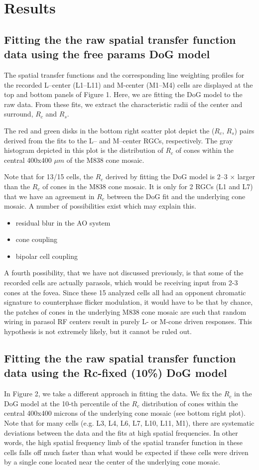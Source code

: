 \documentclass[11pt, oneside]{article}   	%
\begin{document}
\section{Results}
%
\subsection{Fitting the the raw spatial transfer function data using the free params DoG model}
The spatial transfer functions and the corresponding line weighting profiles for the recorded L--center (L1--L11) and M-center (M1--M4) cells are displayed at the top and bottom panels of Figure 1. Here, we are fitting the DoG model to the raw data. From these fits, we extract the characteristic radii of the center and surround,  $R_c$  and $R_s$. 

The red and green disks in the bottom right scatter plot depict the ($R_c$, $R_s$) pairs derived from the fits to the L-- and M--center RGCs, respectively. The gray histogram depicted in this plot is the distribution of $R_c$ of cones within the central 400x400 $\mu m$  of the M838 cone mosaic.

Note that for 13/15 cells, the $R_c$ derived by fitting the DoG model is 2--3 $\times$  larger than the $R_c$ of cones in the M838 cone mosaic. It is only for 2 RGCs (L1 and L7) that we have an agreement in $R_c$ between the DoG fit and the underlying cone mosaic. A number of possibilities exist which may explain this.
\begin{itemize}
\item residual blur in the AO system
\item cone coupling
\item bipolar cell coupling
\end{itemize}

A fourth possibility, that we have not discussed previously, is that some of the recorded cells are actually parasols, which would be receiving input from 2-3 cones at the fovea. Since these 15 analyzed cells all had an opponent chromatic signature to counterphase flicker modulation, it would have to be that by chance, the patches of cones in the underlying M838 cone mosaic are such that random wiring in  parasol RF centers result in purely L- or M-cone driven responses. This hypothesis is not extremely likely, but it cannot be ruled out.

\subsection{Fitting the the raw spatial transfer function data using the Rc-fixed (10\%) DoG model}
In Figure 2, we take a different approach in fitting the data. We fix the $R_c$  in the DoG model at the 10-th percentile of the $R_c$ distribution of cones within the central 400x400 microns of the underlying cone mosaic (see bottom right plot). Note that for many cells (e.g. L3, L4, L6, L7, L10, L11, M1), there are systematic deviations between the data and the fits at high spatial frequencies. In other words, the high spatial frequency limb of the spatial transfer function in these cells falls off much faster than what would be expected if these cells were driven by a single cone located near the center of the underlying cone mosaic.
\end{document}
